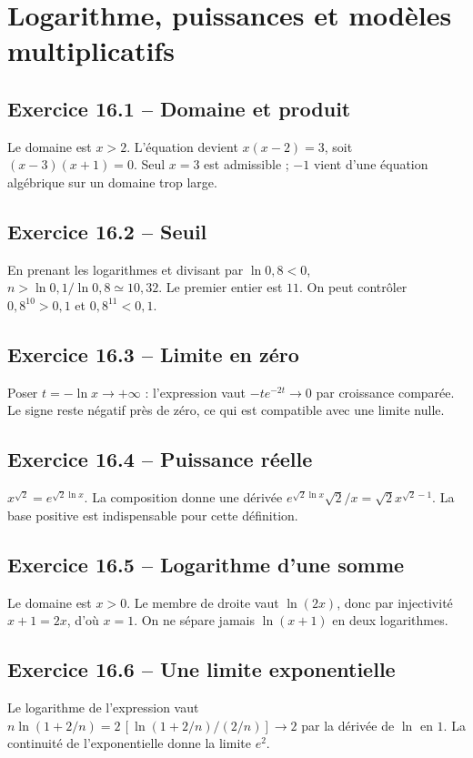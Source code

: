\chapter{Logarithme, puissances et modèles multiplicatifs}
\section*{Exercice 16.1 -- Domaine et produit}
Le domaine est $x>2$. L'équation devient $x(x-2)=3$, soit $(x-3)(x+1)=0$. Seul $x=3$ est admissible ; $-1$ vient d'une équation algébrique sur un domaine trop large.

\section*{Exercice 16.2 -- Seuil}
En prenant les logarithmes et divisant par $\ln0{,}8<0$, $n>\ln0{,}1/\ln0{,}8\simeq10{,}32$. Le premier entier est $11$. On peut contrôler $0{,}8^{10}>0{,}1$ et $0{,}8^{11}<0{,}1$.

\section*{Exercice 16.3 -- Limite en zéro}
Poser $t=-\ln x\to+\infty$ : l'expression vaut $-te^{-2t}\to0$ par croissance comparée. Le signe reste négatif près de zéro, ce qui est compatible avec une limite nulle.

\section*{Exercice 16.4 -- Puissance réelle}
$x^{\sqrt2}=e^{\sqrt2\ln x}$. La composition donne une dérivée $e^{\sqrt2\ln x}\sqrt2/x=\sqrt2 x^{\sqrt2-1}$. La base positive est indispensable pour cette définition.

\section*{Exercice 16.5 -- Logarithme d’une somme}
Le domaine est $x>0$. Le membre de droite vaut $\ln(2x)$, donc par injectivité $x+1=2x$, d'où $x=1$. On ne sépare jamais $\ln(x+1)$ en deux logarithmes.

\section*{Exercice 16.6 -- Une limite exponentielle}
Le logarithme de l'expression vaut $n\ln(1+2/n)=2\,[\ln(1+2/n)/(2/n)]\to2$ par la dérivée de $\ln$ en $1$. La continuité de l'exponentielle donne la limite $e^2$.
